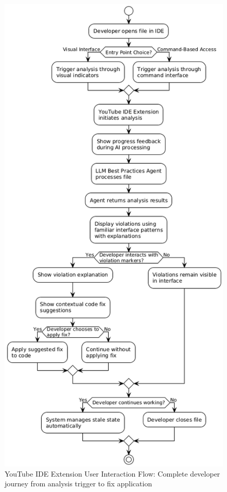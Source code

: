 \begin{spacing}{1.2}
\begin{figure}[H]
\centering
\includegraphics[scale=0.6]{images/user_flow.png}
\caption{YouTube IDE Extension User Interaction Flow: Complete developer journey from analysis trigger to fix application}
\label{fig:user_interface_flow}
\end{figure}


\end{spacing}
